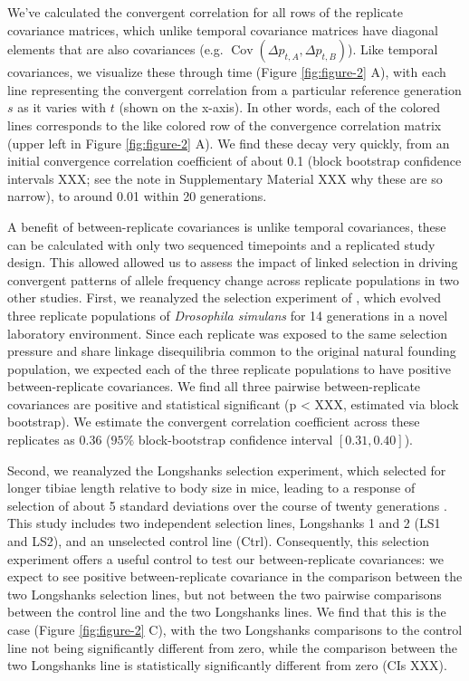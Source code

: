 \documentclass[11pt]{article}
\DeclareMathOperator{\cov}{Cov}
\begin{document}
We've calculated the convergent correlation for all rows of the replicate
covariance matrices, which unlike temporal covariance matrices have diagonal
elements that are also covariances (e.g. $\cov(\Delta p_{t,A}, \Delta
p_{t,B})$). Like temporal covariances, we visualize these through time (Figure
\ref{fig:figure-2} A), with each line representing the convergent correlation
from a particular reference generation $s$ as it varies with $t$ (shown on the
x-axis). In other words, each of the colored lines corresponds to the like
colored row of the convergence correlation matrix (upper left in Figure
\ref{fig:figure-2} A). We find these decay very quickly, from an initial
convergence correlation coefficient of about 0.1 (block bootstrap confidence
intervals XXX; see the note in Supplementary Material XXX why these are so
narrow), to around 0.01 within 20 generations.

A benefit of between-replicate covariances is unlike temporal covariances,
these can be calculated with only two sequenced timepoints and a replicated
study design. This allowed allowed us to assess the impact of linked selection
in driving convergent patterns of allele frequency change across replicate
populations in two other studies. First, we reanalyzed the selection experiment
of \textcite{Kelly2019-dc}, which evolved three replicate populations of
\emph{Drosophila simulans} for 14 generations in a novel laboratory
environment. Since each replicate was exposed to the same selection pressure
and share linkage disequilibria common to the original natural founding
population, we expected each of the three replicate populations to have
positive between-replicate covariances. We find all three pairwise
between-replicate covariances are positive and statistical significant (p <
XXX, estimated via block bootstrap). We estimate the convergent correlation
coefficient across these replicates as 0.36 ($95\%$ block-bootstrap confidence
interval $[0.31, 0.40]$).

Second, we reanalyzed the Longshanks selection experiment, which selected for
longer tibiae length relative to body size in mice, leading to a response of
selection of about 5 standard deviations over the course of twenty generations
\parencite{Castro2019-uk}. This study includes two independent selection lines,
Longshanks 1 and 2 (LS1 and LS2), and an unselected control line (Ctrl).
Consequently, this selection experiment offers a useful control to test our
between-replicate covariances: we expect to see positive between-replicate
covariance in the comparison between the two Longshanks selection lines, but
not between the two pairwise comparisons between the control line and the two
Longshanks lines. We find that this is the case (Figure \ref{fig:figure-2} C),
with the two Longshanks comparisons to the control line not being significantly
different from zero, while the comparison between the two Longshanks line is
statistically significantly different from zero (CIs XXX).
\end{document}
